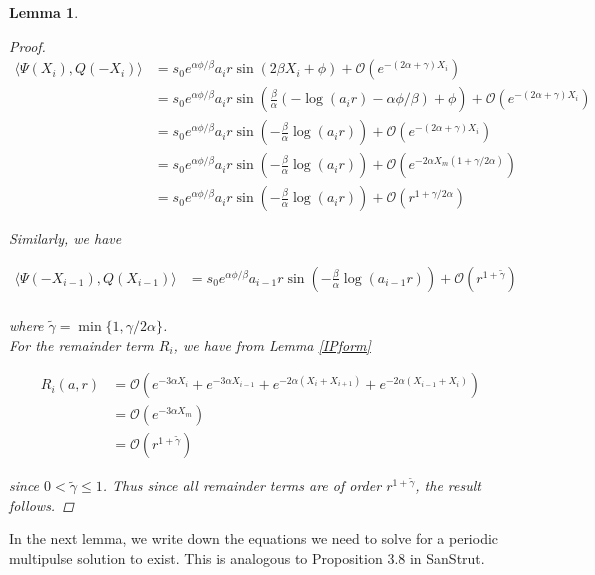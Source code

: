 \documentclass[12pt]{article}
\newtheorem{lemma}{Lemma}
\begin{document}
\begin{lemma}
\begin{proof}
\begin{align*}
\langle \Psi(X_i), Q(-X_i) \rangle 
&= s_0 e^{\alpha \phi / \beta } a_i r \sin \left( 2 \beta X_i  + \phi \right) + \mathcal{O}(e^{-(2 \alpha + \gamma) X_i}) \\
&= s_0 e^{\alpha \phi / \beta } a_i r \sin \left( \frac{\beta}{\alpha} ( -\log (a_i r) - \alpha \phi / \beta ) + \phi \right) + \mathcal{O}(e^{-(2 \alpha + \gamma) X_i}) \\
&= s_0 e^{\alpha \phi / \beta } a_i r \sin \left( - \frac{\beta}{\alpha} \log (a_i r) \right) + \mathcal{O}(e^{-(2 \alpha + \gamma) X_i}) \\
&= s_0 e^{\alpha \phi / \beta } a_i r \sin \left( - \frac{\beta}{\alpha} \log (a_i r) \right) + \mathcal{O}(e^{-2 \alpha X_m (1 + \gamma / 2 \alpha)}) \\
&= s_0 e^{\alpha \phi / \beta } a_i r \sin \left( - \frac{\beta}{\alpha} \log (a_i r) \right) + \mathcal{O}(r^{1 + \gamma / 2 \alpha})
\end{align*}

Similarly, we have

\begin{align*}
\langle \Psi(-X_{i-1}), Q(X_{i-1}) \rangle 
&= s_0 e^{\alpha \phi / \beta } a_{i-1} r \sin \left( - \frac{\beta}{\alpha} \log (a_{i-1} r) \right) + \mathcal{O}(r^{1 + \tilde{\gamma}}) \\
\end{align*}

where $\tilde{\gamma} = \min\{ 1, \gamma / 2 \alpha \}$. \\

For the remainder term $R_i$, we have from Lemma \ref{IPform}

\begin{align*}
R_i(a, r) &= \mathcal{O}( e^{-3 \alpha X_i} +  e^{-3 \alpha X_{i-1}}
+ e^{-2 \alpha (X_i + X_{i+1})} + e^{-2 \alpha (X_{i-1} + X_i)}) \\
&= \mathcal{O}( e^{-3 \alpha X_m} ) \\
&= \mathcal{O}(r^{1 + \tilde{\gamma}}) 
\end{align*}

since $0 < \tilde{\gamma} \leq 1$. Thus since all remainder terms are of order $r^{1 + \tilde{\gamma}}$, the result follows. 

\end{proof}
\end{lemma}

In the next lemma, we write down the equations we need to solve for a periodic multipulse solution to exist. This is analogous to Proposition 3.8 in SanStrut.
\end{document}
